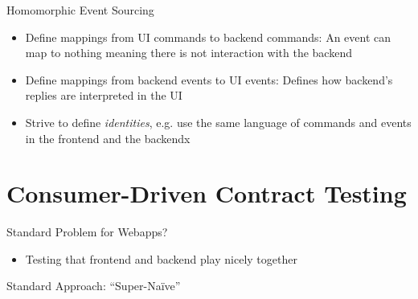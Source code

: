 \begin{frame}[fragile]{Homomorphic Event Sourcing}
  \begin{itemize}
  \item Define mappings from UI commands to backend commands: An event
    can map to nothing meaning there is not interaction with
    the backend
  \item Define mappings from backend events to UI events: Defines how
    backend's replies are interpreted in the UI
  \item Strive to define \emph{identities}, e.g. use the same language of commands and events in the frontend and the backendx
  \end{itemize}
\end{frame}

\part{Consumer-Driven Contract Testing}

\begin{frame}[fragile]{Standard Problem for Webapps?}

\begin{itemize}
\item Testing that frontend and backend play nicely together
\end{itemize}

\end{frame}

\begin{frame}[fragile]{Standard Approach: ``Super-Na\"ive''}



\end{frame}

